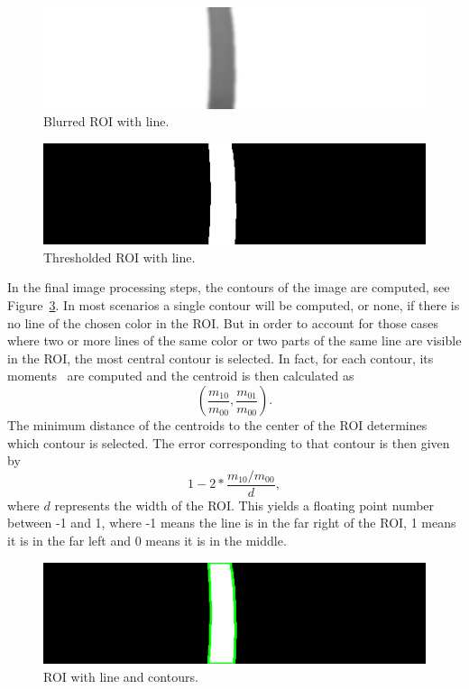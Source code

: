 \documentclass[10pt,conference,compsoc]{IEEEtran}
\begin{document}
\begin{figure}[thpb]
\centering
\includegraphics[scale=0.4]{img/blur.png}
\caption{Blurred ROI with line.}
\label{fig:blur}
\end{figure}

\begin{figure}[thpb!]
\centering
\includegraphics[scale=0.4]{img/thresh.png}
\caption{Thresholded ROI with line.}
\label{fig:thresh}
\end{figure}

In the final image processing steps, the contours of the image are computed, see Figure~\ref{fig:contour}. In most scenarios a single contour will be computed, or none, if there is no line of the chosen color in the ROI. But in order to account for those cases where two or more lines of the same color or two parts of the same line are visible in the ROI, the most central contour is selected. In fact, for each contour, its moments~\cite{moments_wiki} are computed and the centroid is then calculated as $$\left(\frac{m_{10}}{m_{00}}, \frac{m_{01}}{m_{00}}\right).$$ The minimum distance of the centroids to the center of the ROI determines which contour is selected. The error corresponding to that contour is then given by $$1 - 2 * \frac{m_{10}/m_{00}}{d},$$ where $d$ represents the width of the ROI. This yields a floating point number between -1 and 1, where -1 means the line is in the far right of the ROI, 1 means it is in the far left and 0 means it is in the middle.

\begin{figure}[thpb]
\centering
\includegraphics[scale=0.4]{img/contour.png}
\caption{ROI with line and contours.}
\label{fig:contour}
\end{figure}
\end{document}
